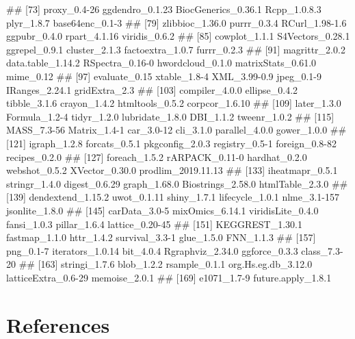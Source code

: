 \documentclass[]{article}
\renewenvironment{verbatim}{\color{codecolor}\begin{myshaded}\begin{oldverbatim}}{\end{oldverbatim}\end{myshaded}}
\begin{document}
\begin{verbatim}
##  [73] proxy_0.4-26         ggdendro_0.1.23      BiocGenerics_0.36.1  Rcpp_1.0.8.3         plyr_1.8.7           base64enc_0.1-3     
##  [79] zlibbioc_1.36.0      purrr_0.3.4          RCurl_1.98-1.6       ggpubr_0.4.0         rpart_4.1.16         viridis_0.6.2       
##  [85] cowplot_1.1.1        S4Vectors_0.28.1     ggrepel_0.9.1        cluster_2.1.3        factoextra_1.0.7     furrr_0.2.3         
##  [91] magrittr_2.0.2       data.table_1.14.2    RSpectra_0.16-0      hwordcloud_0.1.0     matrixStats_0.61.0   mime_0.12           
##  [97] evaluate_0.15        xtable_1.8-4         XML_3.99-0.9         jpeg_0.1-9           IRanges_2.24.1       gridExtra_2.3       
## [103] compiler_4.0.0       ellipse_0.4.2        tibble_3.1.6         crayon_1.4.2         htmltools_0.5.2      corpcor_1.6.10      
## [109] later_1.3.0          Formula_1.2-4        tidyr_1.2.0          lubridate_1.8.0      DBI_1.1.2            tweenr_1.0.2        
## [115] MASS_7.3-56          Matrix_1.4-1         car_3.0-12           cli_3.1.0            parallel_4.0.0       gower_1.0.0         
## [121] igraph_1.2.8         forcats_0.5.1        pkgconfig_2.0.3      registry_0.5-1       foreign_0.8-82       recipes_0.2.0       
## [127] foreach_1.5.2        rARPACK_0.11-0       hardhat_0.2.0        webshot_0.5.2        XVector_0.30.0       prodlim_2019.11.13  
## [133] iheatmapr_0.5.1      stringr_1.4.0        digest_0.6.29        graph_1.68.0         Biostrings_2.58.0    htmlTable_2.3.0     
## [139] dendextend_1.15.2    uwot_0.1.11          shiny_1.7.1          lifecycle_1.0.1      nlme_3.1-157         jsonlite_1.8.0      
## [145] carData_3.0-5        mixOmics_6.14.1      viridisLite_0.4.0    fansi_1.0.3          pillar_1.6.4         lattice_0.20-45     
## [151] KEGGREST_1.30.1      fastmap_1.1.0        httr_1.4.2           survival_3.3-1       glue_1.5.0           FNN_1.1.3           
## [157] png_0.1-7            iterators_1.0.14     bit_4.0.4            Rgraphviz_2.34.0     ggforce_0.3.3        class_7.3-20        
## [163] stringi_1.7.6        blob_1.2.2           rsample_0.1.1        org.Hs.eg.db_3.12.0  latticeExtra_0.6-29  memoise_2.0.1       
## [169] e1071_1.7-9          future.apply_1.8.1
\end{verbatim}

\hypertarget{references}{%
\section*{References}\label{references}}
\end{document}
